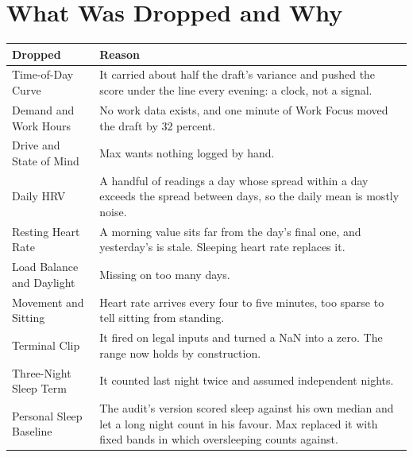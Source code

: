 \documentclass[11pt]{article}
\begin{document}
\section{What Was Dropped and Why}\label{sec:dropped}
\begin{center}
\begin{tabular}{L{0.26\textwidth}L{0.66\textwidth}}
\toprule
Dropped & Reason \\
\midrule
Time-of-Day Curve & It carried about half the draft's variance and pushed the
  score under the line every evening: a clock, not a signal. \\
Demand and Work Hours & No work data exists, and one minute of Work Focus moved
  the draft by 32 percent. \\
Drive and State of Mind & Max wants nothing logged by hand. \\
Daily HRV & A handful of readings a day whose spread within a day exceeds the
  spread between days, so the daily mean is mostly noise. \\
Resting Heart Rate & A morning value sits far from the day's final one, and
  yesterday's is stale. Sleeping heart rate replaces it. \\
Load Balance and Daylight & Missing on too many days. \\
Movement and Sitting & Heart rate arrives every four to five minutes, too sparse
  to tell sitting from standing. \\
Terminal Clip & It fired on legal inputs and turned a NaN into a zero. The range
  now holds by construction. \\
Three-Night Sleep Term & It counted last night twice and assumed independent
  nights. \\
Personal Sleep Baseline & The audit's version scored sleep against his own median
  and let a long night count in his favour. Max replaced it with fixed bands in
  which oversleeping counts against. \\
\bottomrule
\end{tabular}
\end{center}
\end{document}

